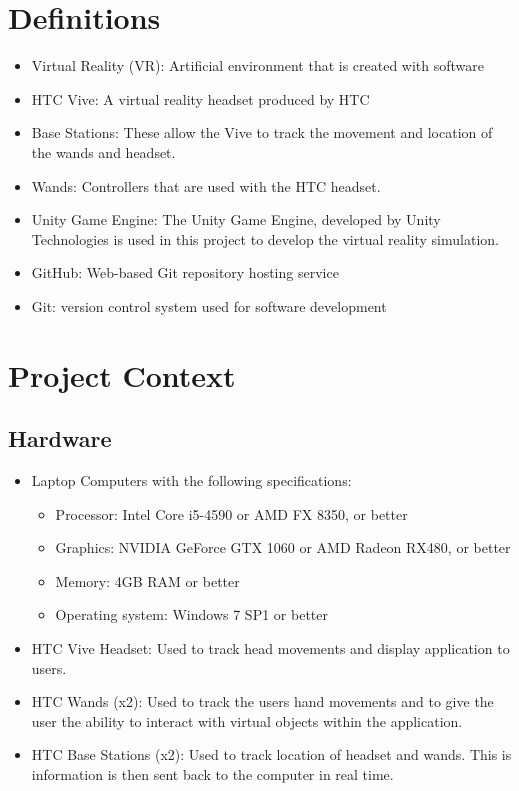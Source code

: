 \documentclass[10pt,journal,compsoc,onecolumn, draftclsnofoot]{IEEEtran}
\begin{document}
\section{Definitions}
\begin{itemize}
  \item Virtual Reality (VR):  Artificial environment that is created with software
  \item HTC Vive: A virtual reality headset produced by HTC
  \item Base Stations: These allow the Vive to track the movement and location of the wands and headset.
  \item Wands: Controllers that are used with the HTC headset.
  \item Unity Game Engine: The Unity Game Engine, developed by Unity Technologies is used in this project to develop the virtual reality simulation.
  \item GitHub: Web-based Git repository hosting service
  \item Git: version control system used for software development
\end{itemize}

\section{Project Context}
\subsection{Hardware}
\begin{itemize}
  \item Laptop Computers with the following specifications:
  \begin{itemize}
    \item Processor: Intel Core i5-4590 or AMD FX 8350, or better
    \item Graphics: NVIDIA GeForce GTX 1060 or AMD Radeon RX480, or better
    \item Memory: 4GB RAM or better
    \item Operating system: Windows 7 SP1 or better
  \end{itemize}
  \item HTC Vive Headset: Used to track head movements and display application to users.
  \item HTC Wands (x2): Used to track the users hand movements and to give the user the ability to interact with virtual objects within the application.
  \item HTC Base Stations (x2): Used to track location of headset and wands. This is information is then sent back to the computer in real time.
\end{itemize}
\end{document}
